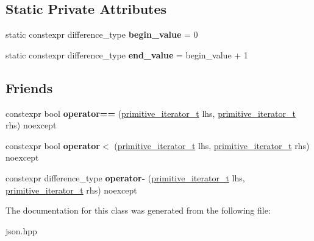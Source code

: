 \subsection*{Static Private Attributes}
\begin{DoxyCompactItemize}
\item 
\mbox{\label{classnlohmann_1_1detail_1_1primitive__iterator__t_afcb3bcf9da8aa95bd82067d1a67c2326}} 
static constexpr difference\+\_\+type {\bfseries begin\+\_\+value} = 0
\item 
\mbox{\label{classnlohmann_1_1detail_1_1primitive__iterator__t_aa37c37da44f19e6ec1d7d4a9910511c7}} 
static constexpr difference\+\_\+type {\bfseries end\+\_\+value} = begin\+\_\+value + 1
\end{DoxyCompactItemize}
\subsection*{Friends}
\begin{DoxyCompactItemize}
\item 
\mbox{\label{classnlohmann_1_1detail_1_1primitive__iterator__t_aae1e1e2ec0e229d1291d69de57d76bbe}} 
constexpr bool {\bfseries operator==} (\mbox{\hyperlink{classnlohmann_1_1detail_1_1primitive__iterator__t}{primitive\+\_\+iterator\+\_\+t}} lhs, \mbox{\hyperlink{classnlohmann_1_1detail_1_1primitive__iterator__t}{primitive\+\_\+iterator\+\_\+t}} rhs) noexcept
\item 
\mbox{\label{classnlohmann_1_1detail_1_1primitive__iterator__t_a901a95e6d73c9509d3dcde914f6c8a9d}} 
constexpr bool {\bfseries operator$<$} (\mbox{\hyperlink{classnlohmann_1_1detail_1_1primitive__iterator__t}{primitive\+\_\+iterator\+\_\+t}} lhs, \mbox{\hyperlink{classnlohmann_1_1detail_1_1primitive__iterator__t}{primitive\+\_\+iterator\+\_\+t}} rhs) noexcept
\item 
\mbox{\label{classnlohmann_1_1detail_1_1primitive__iterator__t_ac6d902d6ec9a02dabed5452d3ae78f7e}} 
constexpr difference\+\_\+type {\bfseries operator-\/} (\mbox{\hyperlink{classnlohmann_1_1detail_1_1primitive__iterator__t}{primitive\+\_\+iterator\+\_\+t}} lhs, \mbox{\hyperlink{classnlohmann_1_1detail_1_1primitive__iterator__t}{primitive\+\_\+iterator\+\_\+t}} rhs) noexcept
\end{DoxyCompactItemize}


The documentation for this class was generated from the following file\+:\begin{DoxyCompactItemize}
\item 
json.\+hpp\end{DoxyCompactItemize}
